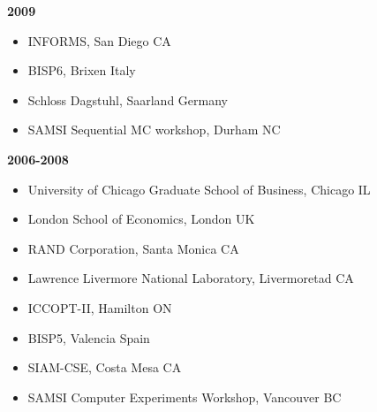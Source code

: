 \documentclass[margin,line]{res}
\begin{document}
\begin{resume}
{\bf 2009}
\begin{itemize}
\item INFORMS, San Diego CA
\item BISP6, Brixen Italy
\item Schloss Dagstuhl, Saarland Germany
\item SAMSI Sequential MC workshop, Durham NC
\end{itemize}


{\bf 2006-2008}
\begin{itemize}
\item University of Chicago Graduate School of Business, Chicago IL
\item London School of Economics, London UK
\item RAND Corporation, Santa Monica CA
\item Lawrence Livermore National Laboratory, Livermoretad CA
\item ICCOPT-II, Hamilton ON
\item BISP5, Valencia Spain
\item SIAM-CSE, Costa Mesa CA
\item SAMSI Computer Experiments Workshop, Vancouver BC
\end{itemize}




\end{resume}
\end{document}
